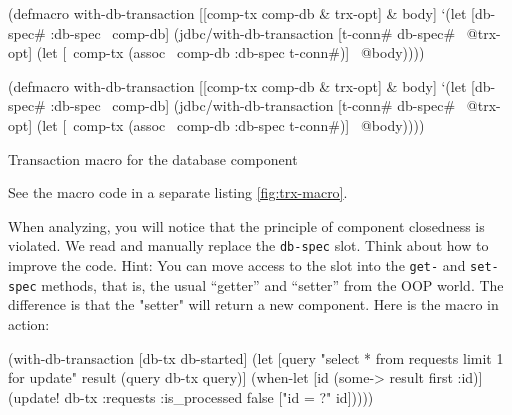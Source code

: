 \begin{listing}[ht!]

\ifnarrow

\begin{english}
  \begin{clojure}
(defmacro with-db-transaction
  [[comp-tx comp-db & trx-opt] & body]
  `(let [{db-spec# :db-spec} ~comp-db]
     (jdbc/with-db-transaction
       [t-conn# db-spec# ~@trx-opt]
       (let [~comp-tx
             (assoc ~comp-db
               :db-spec t-conn#)]
         ~@body))))
  \end{clojure}
\end{english}

\else

\begin{english}
  \begin{clojure}
(defmacro with-db-transaction
  [[comp-tx comp-db & trx-opt] & body]
  `(let [{db-spec# :db-spec} ~comp-db]
     (jdbc/with-db-transaction
       [t-conn# db-spec# ~@trx-opt]
       (let [~comp-tx (assoc ~comp-db :db-spec t-conn#)]
         ~@body))))
  \end{clojure}
\end{english}

\fi

\caption{Transaction macro for the database component}
\label{fig:trx-macro}

\end{listing}


See the macro code in a separate listing \ref{fig:trx-macro}.

When analyzing, you will notice that the principle of component closedness is violated. We read and manually replace the \verb|db-spec| slot. Think about how to improve the code. Hint: You can move access to the slot into the \verb|get-| and \verb|set-spec| methods, that is, the usual ``getter'' and ``setter'' from the OOP world. The difference is that the "setter" will return a new component. Here is the macro in action:

\ifnarrow

\begin{english}
  \begin{clojure}
(with-db-transaction
  [db-tx db-started]
  (let [query "select * from requests
               limit 1 for update"
        result (query db-tx query)]
    (when-let [id (some->
                    result first :id)]
      (update! db-tx :requests
               {:is_processed false}
               ["id = ?" id]))))
  \end{clojure}
\end{english}

